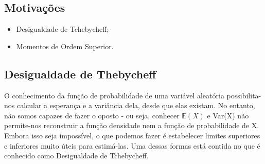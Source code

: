 \documentclass{article}
\begin{document}
\subsection{Motivações}
\begin{itemize}
  \item Desigualdade de Tchebycheff;
  \item Momentos de Ordem Superior.
\end{itemize}
\subsection{Desigualdade de Thebycheff}
  O conhecimento da função de probabilidade de uma variável aleatória possibilita-nos calcular a esperança e a variância
dela, desde que elas existam. No entanto, não somos capazes de fazer o oposto - ou seja, conhecer \(\mathbb{E}(X)\)
e Var(X) não permite-nos reconstruir a função densidade nem a função de probabilidade de X.
Embora isso seja impossível, o que podemos fazer é estabelecer limites superiores e inferiores muito úteis para estimá-las.
Uma dessas formas está contida no que é conhecido como Desigualdade de Tchebycheff.
\end{document}
